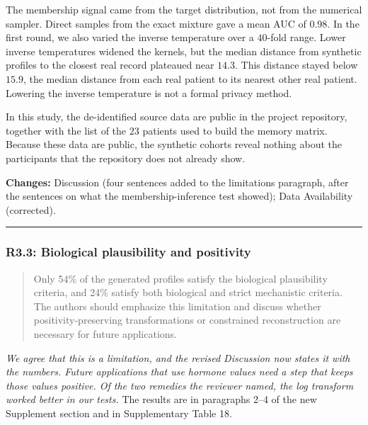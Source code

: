 \documentclass[
  11pt,
  letterpaper,
]{article}
\begin{document}
The membership signal came from the target distribution, not from the
numerical sampler. Direct samples from the exact mixture gave a mean AUC
of \(0.98\). In the first round, we also varied the inverse temperature
over a \(40\)-fold range. Lower inverse temperatures widened the
kernels, but the median distance from synthetic profiles to the closest
real record plateaued near \(14.3\). This distance stayed below
\(15.9\), the median distance from each real patient to its nearest
other real patient. Lowering the inverse temperature is not a formal
privacy method.

In this study, the de-identified source data are public in the project
repository, together with the list of the \(23\) patients used to build
the memory matrix. Because these data are public, the synthetic cohorts
reveal nothing about the participants that the repository does not
already show.

\textbf{Changes:} Discussion (four sentences added to the limitations
paragraph, after the sentences on what the membership-inference test
showed); Data Availability (corrected).

\begin{center}\rule{0.5\linewidth}{0.5pt}\end{center}

\subsubsection{R3.3: Biological plausibility and
positivity}\label{r3.3-biological-plausibility-and-positivity}

\begin{quote}
Only 54\% of the generated profiles satisfy the biological plausibility
criteria, and 24\% satisfy both biological and strict mechanistic
criteria. The authors should emphasize this limitation and discuss
whether positivity-preserving transformations or constrained
reconstruction are necessary for future applications.
\end{quote}

\emph{We agree that this is a limitation, and the revised Discussion now
states it with the numbers. Future applications that use hormone values
need a step that keeps those values positive. Of the two remedies the
reviewer named, the log transform worked better in our tests.} The
results are in paragraphs 2--4 of the new Supplement section and in
Supplementary Table 18.
\end{document}
